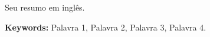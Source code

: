 \begin{resumo}[Abstract]
Seu resumo em inglês.

\noindent \textbf{Keywords:} Palavra 1, Palavra 2, Palavra 3, Palavra 4.
\end{resumo}